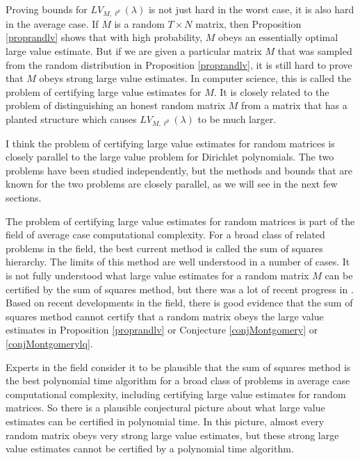 \documentclass{amsart}
\begin{document}
Proving bounds for $LV_{M, \ell^p}(\lambda)$ is not just hard in the worst case, it is also hard in the average case.  If $M$ is a random $T \times N$ matrix, then Proposition \ref{proprandlv} shows that with high probability, $M$ obeys an essentially optimal large value estimate.  But if we are given a particular matrix $M$ that was sampled from the random distribution in Proposition \ref{proprandlv}, it is still hard to prove that $M$ obeys strong large value estimates.  In computer science, this is called the problem of certifying large value estimates for $M$.  It is closely related to the problem of distinguishing an honest random matrix $M$ from a matrix that has a planted structure which causes $LV_{M, \ell^p}(\lambda)$ to be much larger.

I think the problem of certifying large value estimates for random matrices is closely parallel to the large value problem for Dirichlet polynomials.  The two problems have been studied independently, but the methods and bounds that are known for the two problems are closely parallel, as we will see in the next few sections.

The problem of certifying large value estimates for random matrices is part of the field of average case computational complexity.   For a broad class of related problems in the field, the best current method is called the sum of squares hierarchy.  The limits of this method are well understood in a number of cases.  It is not fully understood what large value estimates for a random matrix $M$ can be certified by the sum of squares method, but there was a lot of recent progress in \cite{DHPT}.  Based on recent developments in the field, there is good evidence that the sum of squares method cannot certify that a random matrix obeys the large value estimates in Proposition \ref{proprandlv} or Conjecture \ref{conjMontgomery} or \ref{conjMontgomerylq}.  

Experts in the field consider it to be plausible that the sum of squares method is the best polynomial time algorithm for a broad class of problems in average case computational complexity, including certifying large value estimates for random matrices.  So there is a plausible conjectural picture about what large value estimates can be certified in polynomial time.  In this picture, almost every random matrix obeys very strong large value estimates, but these strong large value estimates cannot be certified by a polynomial time algorithm. 
\end{document}
